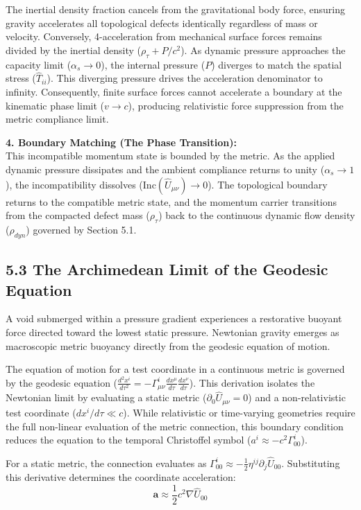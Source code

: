 The inertial density fraction cancels from the gravitational body force, ensuring gravity accelerates all topological defects identically regardless of mass or velocity. Conversely, 4-acceleration from mechanical surface forces remains divided by the inertial density ($\rho_\tau + P/c^2$). As dynamic pressure approaches the capacity limit ($\alpha_s \to 0$), the internal pressure ($P$) diverges to match the spatial stress ($\hat{T}_{ii}$). This diverging pressure drives the acceleration denominator to infinity. Consequently, finite surface forces cannot accelerate a boundary at the kinematic phase limit ($v \to c$), producing relativistic force suppression from the metric compliance limit.

\textbf{4. Boundary Matching (The Phase Transition):} \\
This incompatible momentum state is bounded by the metric. As the applied dynamic pressure dissipates and the ambient compliance returns to unity ($\alpha_s \to 1$), the incompatibility dissolves ($\text{Inc}(\hat{U}_{\mu\nu}) \to 0$). The topological boundary returns to the compatible metric state, and the momentum carrier transitions from the compacted defect mass ($\rho_\tau$) back to the continuous dynamic flow density ($\rho_{dyn}$) governed by Section 5.1.



\subsection*{5.3 The Archimedean Limit of the Geodesic Equation} 
A void submerged within a pressure gradient experiences a restorative buoyant force directed toward the lowest static pressure. Newtonian gravity emerges as macroscopic metric buoyancy directly from the geodesic equation of motion.

The equation of motion for a test coordinate in a continuous metric is governed by the geodesic equation ($\frac{d^2 x^i}{d\tau^2} = - \Gamma^i_{\mu\nu} \frac{dx^\mu}{d\tau} \frac{dx^\nu}{d\tau}$). This derivation isolates the Newtonian limit by evaluating a static metric ($\partial_0 \hat{U}_{\mu\nu} = 0$) and a non-relativistic test coordinate ($dx^i/d\tau \ll c$). While relativistic or time-varying geometries require the full non-linear evaluation of the metric connection, this boundary condition reduces the equation to the temporal Christoffel symbol ($a^i \approx -c^2 \Gamma^i_{00}$). 

For a static metric, the connection evaluates as $\Gamma^i_{00} \approx -\frac{1}{2}\eta^{ij}\partial_j \hat{U}_{00}$. Substituting this derivative determines the coordinate acceleration:
\begin{equation}
    \mathbf{a} \approx \frac{1}{2} c^2 \nabla \hat{U}_{00}
\end{equation}

